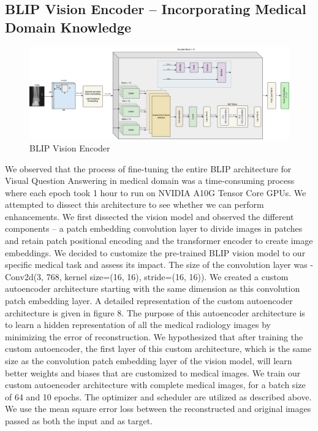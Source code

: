 \documentclass[pdflatex,sn-mathphys-num]{sn-jnl}%
\begin{document}
\subsection{BLIP Vision Encoder – Incorporating Medical Domain Knowledge}\label{subsec3.3}
\begin{figure}[h]
\includegraphics[width=1.0\textwidth]{figs/BLIPVision_final.drawio.png}
\caption{BLIP Vision Encoder}
\centering
\end{figure}
We observed that the process of fine-tuning the entire BLIP architecture for Visual Question Answering in medical domain was a time-consuming process where each epoch took 1 hour to run on NVIDIA A10G Tensor Core GPUs. We attempted to dissect this architecture to see whether we can perform enhancements. We first dissected the vision model and observed the different components – a patch embedding convolution layer to divide images in patches and retain patch positional encoding and the transformer encoder to create image embeddings. We decided to customize the pre-trained BLIP vision model to our specific medical task and assess its impact. The size of the convolution layer was - Conv2d(3, 768, kernel size=(16, 16), stride=(16, 16)). We created a custom autoencoder architecture starting with the same dimension as this convolution patch embedding layer. A detailed representation of the custom autoencoder architecture is given in figure 8. The purpose of this autoencoder architecture is to learn a hidden representation of all the medical radiology images by minimizing the error of reconstruction. We hypothesized that after training the custom autoencoder, the first layer of this custom architecture, which is the same size as the convolution patch embedding layer of the vision model, will learn better weights and biases that are customized to medical images. We train our custom autoencoder architecture with complete medical images, for a batch size of 64 and 10 epochs. The optimizer and scheduler are utilized as described above. We use the mean square error loss between the reconstructed and original images passed as both the input and as target. 
\end{document}
